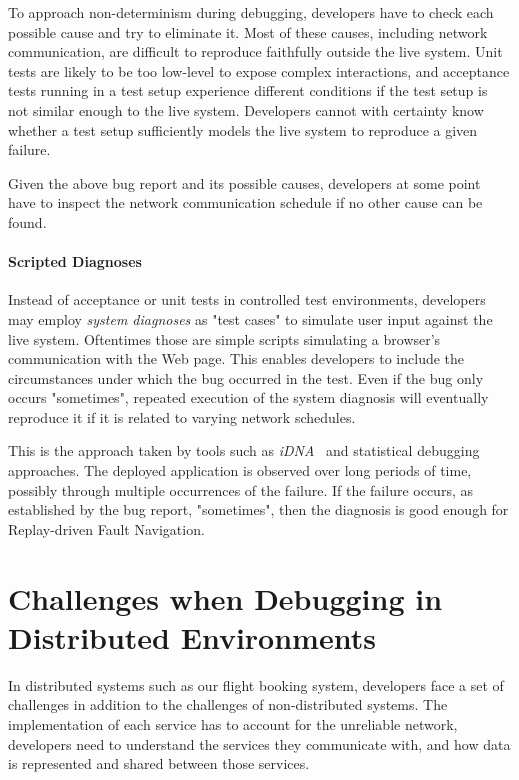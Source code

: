To approach non-determinism during debugging, developers have to check
each possible cause and try to eliminate it. Most of these causes,
including network communication, are difficult to reproduce faithfully
outside the live system. Unit tests are likely to be too low-level to
expose complex interactions, and acceptance tests running in a test
setup experience different conditions if the test setup is not
similar enough to the live system. Developers cannot with certainty
know whether a test setup sufficiently models the live system to
reproduce a given failure.

Given the above bug report and its possible causes, developers at some
point have to inspect the network communication schedule if no other
cause can be found.

\paragraph{Scripted Diagnoses}
\label{sec:scripted-clients}

Instead of acceptance or unit tests in controlled test environments,
developers may employ \emph{system diagnoses} as "test cases" to
simulate user input against the live system. Oftentimes those are
simple scripts simulating a browser's communication with the Web
page. This enables developers to include the circumstances under which
the bug occurred in the test. Even if the bug only occurs "sometimes",
repeated execution of the system diagnosis will eventually reproduce
it if it is related to varying network schedules.

This is the approach taken by tools such as
\emph{iDNA}~\cite{Bhansali2006} and statistical debugging
approaches. The deployed application is observed over long periods of
time, possibly through multiple occurrences of the failure. If the
failure occurs, as established by the bug report, "sometimes", then
the diagnosis is good enough for Replay-driven Fault Navigation.

\section{Challenges when Debugging in Distributed Environments}
\label{sec:debugg-distr-envir}

In distributed systems such as our flight booking system, developers
face a set of challenges in addition to the challenges of
non-distributed systems. The implementation of each service has to
account for the unreliable network, developers need to understand the
services they communicate with, and how data is represented and shared
between those
services.\\

